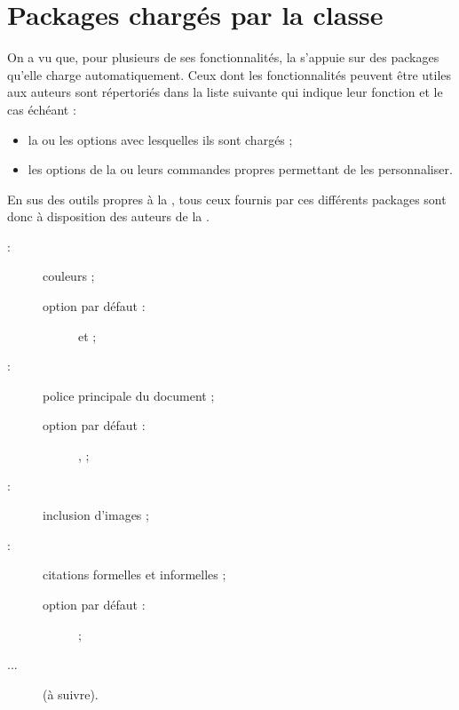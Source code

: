 \section{Packages chargés par la classe}\label{sec-packages-charges-par}

On a vu que, pour plusieurs de ses fonctionnalités, la \gztauthorcl{} s'appuie
sur des packages qu'elle charge automatiquement. Ceux dont les fonctionnalités
peuvent être utiles aux auteurs sont répertoriés dans la liste suivante qui
indique leur fonction et le cas échéant :
\begin{itemize}
\item la ou les options avec lesquelles ils sont chargés ;
\item les options de la \gztauthorcl{} ou leurs commandes propres permettant de les
  personnaliser.
\end{itemize}
En sus des outils propres à la \gztauthorcl, tous ceux fournis par ces
différents packages sont donc à disposition des auteurs de la \gzt{}.

\begin{description}
\item[ :] couleurs ;
  \begin{description}
  \item[option par défaut :]  et  ;
  \end{description}
\item[ :] police principale du document ;
  \begin{description}
  \item[option par défaut :] ,  ;
  \end{description}
\item[ :] inclusion d'images ;
\item[ :] citations formelles et informelles ;
  \begin{description}
  \item[option par défaut :]  ;
  \end{description}
\item[...] (à suivre).
\end{description}

